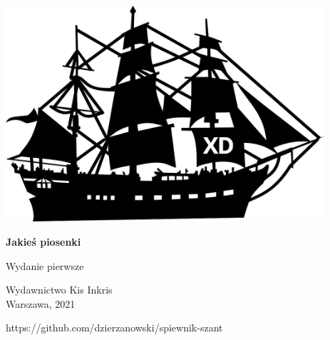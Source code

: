 \documentclass[11pt, twoside]{book}
\begin{document}
\begin{titlepage}
    \begin{center}
        \vspace*{5cm}
        
        \includegraphics[height=8cm]{images/front-obrazek.png}

        \vspace{1.5cm}

        \Huge\textbf{Jakieś piosenki}
        
        \vspace{0.5cm}
        
        \LARGE Wydanie pierwsze
        
        \vfill

        \Large
        Wydawnictwo Kis Inkris \\
        Warszawa, 2021

        \vspace{0.5cm}

        \footnotesize
        https://github.com/dzierzanowski/spiewnik-szant

    \end{center}
\end{titlepage}
\end{document}
